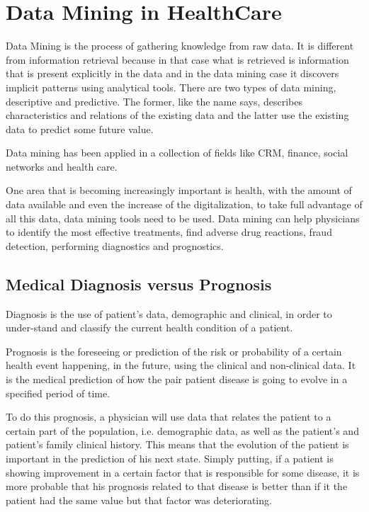 \chapter{Data Mining in HealthCare}
\label{section:state}

Data Mining is the process of gathering knowledge from raw data. It is different from information retrieval because in that case what is
 retrieved is information that is present explicitly in the data and in the data mining case it discovers implicit patterns using analytical 
 tools. There are two types of data mining, descriptive and predictive. The former, like the name says, describes characteristics and relations
 of the existing data and the latter use the existing data to predict some future value.

Data mining has been applied in a collection of fields like CRM, finance, social networks and health care. 

One area that is becoming increasingly important is health, with the amount of data available and even the
 increase of the digitalization, to take full advantage of all this data, data mining tools need to be used. Data mining can help physicians
 to identify the most effective treatments, find adverse drug reactions, fraud detection, performing diagnostics and prognostics.

\section{Medical Diagnosis versus Prognosis}
\label{subsection:diagvsprog}

Diagnosis is the use of patient’s data, demographic and clinical, in order to under-stand and classify the current health condition of a patient.

Prognosis is the foreseeing or prediction of the risk or probability of a certain health event happening, in the future, using the clinical and
 non-clinical data. It is the medical prediction of how the pair patient disease is going to evolve in a specified period of time.

To do this prognosis, a physician will use data that relates the patient to a certain part of the population, i.e. demographic data, as well
 as the patient’s and patient’s family clinical history. This means that the evolution of the patient is important in the prediction of his next
 state. Simply putting, if a patient is showing improvement in a certain factor that is responsible for some disease, it is more probable that
 his prognosis related to that disease is better than if it the patient had the same value but that factor was deteriorating.  

